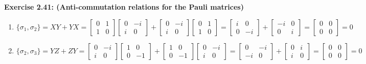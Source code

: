 \documentclass{article}
\begin{document}
\begin{framed}
    \noindent \textbf{Exercise 2.41: (Anti-commutation relations for the Pauli matrices)}
    
    \medskip
    \begin{enumerate}
        \item $\{\sigma_1, \sigma_2\} = XY + YX = \begin{bmatrix}0 & 1 \\ 1 & 0\end{bmatrix} \begin{bmatrix}0 & -i \\ i & 0\end{bmatrix} + \begin{bmatrix}0 & -i \\ i & 0\end{bmatrix} \begin{bmatrix}0 & 1 \\ 1 & 0\end{bmatrix} = \begin{bmatrix}i & 0 \\ 0 & -i\end{bmatrix} + \begin{bmatrix}-i & 0 \\ 0 & i\end{bmatrix} = \begin{bmatrix}0 & 0 \\ 0 & 0\end{bmatrix} = 0$
        \item $\{\sigma_2, \sigma_3\} = YZ + ZY = \begin{bmatrix}0 & -i \\ i & 0\end{bmatrix} \begin{bmatrix}1 & 0 \\ 0 & -1\end{bmatrix} + \begin{bmatrix}1 & 0 \\ 0 & -1\end{bmatrix} \begin{bmatrix}0 & -i \\ i & 0\end{bmatrix} = \begin{bmatrix}0 & -i \\ -i & 0\end{bmatrix} + \begin{bmatrix}0 & i \\ i & 0\end{bmatrix} = \begin{bmatrix}0 & 0 \\ 0 & 0\end{bmatrix} = 0$

\end{enumerate}
\end{framed}
\end{document}
